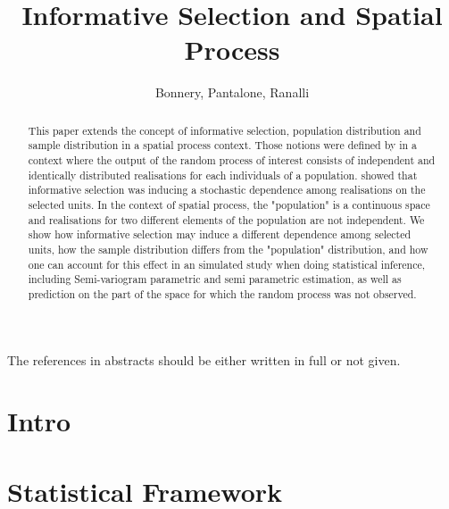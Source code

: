 \documentclass[12pt]{article}
\title{Informative Selection and Spatial Process}
\date{}
\author{Bonnery,  Pantalone, Ranalli}
\theoremstyle{definition}
\theoremstyle{remark}
\begin{document}
\normalem %

\maketitle

\tableofcontents

\begin{abstract}
This paper extends the concept of informative selection, population distribution and sample distribution in a spatial process context.
Those notions were defined by 
\cite{pfefferman_1992} in a context where the output of the random process of interest consists of independent and identically distributed realisations for each individuals of a population. \cite{BonneryBreidtCoquet} showed that informative selection was inducing a stochastic dependence among realisations on the selected units. In the context of spatial process, the "population" is a continuous space and realisations for two different elements of the population are not independent. We show how informative selection may induce a different dependence among selected units, how the sample distribution differs from the "population" distribution, and how one can  account for this effect in an simulated study when doing statistical inference, including Semi-variogram parametric and semi parametric estimation, as well as prediction on the part of the space for which the random process was not observed.
\end{abstract}

{\color{red} The references in abstracts should be either written in full or not given}.

\section{Intro}


\section{Statistical Framework} \label{sec:stat_fra}
\end{document}
